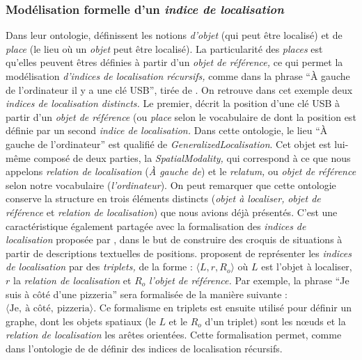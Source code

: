 \subsubsection{Modélisation formelle d'un \emph{indice de localisation}}

Dans leur ontologie, \textcite{Bateman2010} définissent les notions
\emph{d'objet} (qui peut être localisé) et de \emph{place} (le lieu où
un \emph{objet} peut être localisé). La particularité des
\emph{places} est qu'elles peuvent êtres définies à partir d'un
\emph{objet de référence,} ce qui permet la modélisation
\emph{d'indices de localisation récursifs,} comme dans la phrase
\enquote{À gauche de l'ordinateur il y a une clé USB}, tirée de
\textcite{Bateman2010}. On retrouve dans cet exemple deux
\emph{indices de localisation distincts.} Le premier, décrit la
position d'une clé USB à partir d'un \emph{objet de référence} (ou
\emph{place} selon le vocabulaire de \textcite{Bateman2010} dont la
position est définie par un second \emph{indice de localisation.} Dans
cette ontologie, le lieu \enquote{À gauche de l'ordinateur} est
qualifié de \emph{GeneralizedLocalisation}. Cet objet est lui-même
composé de deux parties, la \emph{SpatialModality,} qui correspond à
ce que nous appelons \emph{relation de localisation} (\emph{À gauche
  de}) et le \emph{relatum,} ou \emph{objet de référence} selon notre
vocabulaire (\emph{l'ordinateur}). On peut remarquer que cette
ontologie conserve la structure en trois éléments distincts
(\emph{objet à localiser,} \emph{objet de référence} et \emph{relation
  de localisation}) que nous avions déjà présentés. C'est une
caractéristique également partagée avec la formalisation des
\emph{indices de localisation} proposée par \textcite{Vasardani2013},
dans le but de construire des croquis de situations à partir de
descriptions textuelles de positions. \textcite{Vasardani2013}
proposent de représenter les \emph{indices de localisation} par des
\emph{triplets,} de la forme : \(\langle L, r, R_o\rangle\) où \(L\)
est l'objet à localiser, \(r\) la \emph{relation de localisation} et
\(R_o\) \emph{l'objet de référence.} Par exemple, la phrase
\enquote{Je suis à côté d'une pizzeria} sera formalisée de la manière
suivante :
\(\langle \text{Je},\ \text{à côté},\ \text{pizzeria} \rangle\). Ce
formalisme en triplets est ensuite utilisé pour définir un graphe,
dont les objets spatiaux (\ie le \(L\) et le \(R_o\) d'un triplet)
sont les nœuds et la \emph{relation de localisation} les arêtes
orientées. Cette formalisation permet, comme dans l'ontologie de
\textcite{Bateman2010} de définir des indices de localisation
récursifs.

